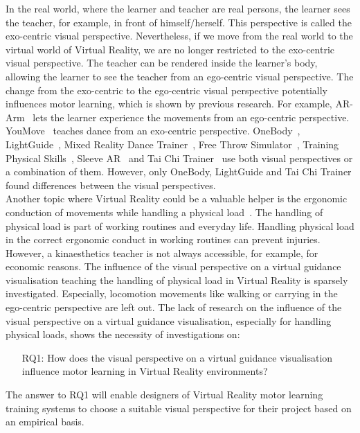 In the real world, where the learner and teacher are real persons, the learner sees the teacher, for example, in front of himself/herself. This perspective is called the exo-centric visual perspective. Nevertheless, if we move from the real world to the virtual world of Virtual Reality, we are no longer restricted to the exo-centric visual perspective. The teacher can be rendered inside the learner's body, allowing the learner to see the teacher from an ego-centric visual perspective. The change from the exo-centric to the ego-centric visual perspective potentially influences motor learning, which is shown by previous research. For example, AR-Arm~\cite{ararm} lets the learner experience the movements from an ego-centric perspective. YouMove~\cite{YouMove} teaches dance from an exo-centric perspective. OneBody~\cite{onebody}, LightGuide~\cite{lightguide}, Mixed Reality Dance Trainer~\cite{mrdancetrainer}, Free Throw Simulator~\cite{freethrowsimulator}, Training Physical Skills~\cite{trainingphysicalskills}, Sleeve AR~\cite{sleevear} and Tai Chi Trainer~\cite{thaichichua} use both visual perspectives or a combination of them. However, only OneBody, LightGuide and Tai Chi Trainer found differences between the visual perspectives.\\
Another topic where Virtual Reality could be a valuable helper is the ergonomic conduction of movements while handling a physical load~\cite{nursecare,kitt}. The handling of physical load is part of working routines and everyday life. Handling physical load in the correct ergonomic conduct in working routines can prevent injuries. However, a kinaesthetics teacher is not always accessible, for example, for economic reasons. The influence of the visual perspective on a virtual guidance visualisation teaching the handling of physical load in Virtual Reality is sparsely investigated. Especially, locomotion movements like walking or carrying in the ego-centric perspective are left out. The lack of research on the influence of the visual perspective on a virtual guidance visualisation, especially for handling physical loads, shows the necessity of investigations on:
\begin{itemize}
	\item[RQ1:] How does the visual perspective on a virtual guidance visualisation influence motor learning in Virtual Reality environments?
\end{itemize}

The answer to RQ1 will enable designers of Virtual Reality motor learning training systems to choose a suitable visual perspective for their project based on an empirical basis.

